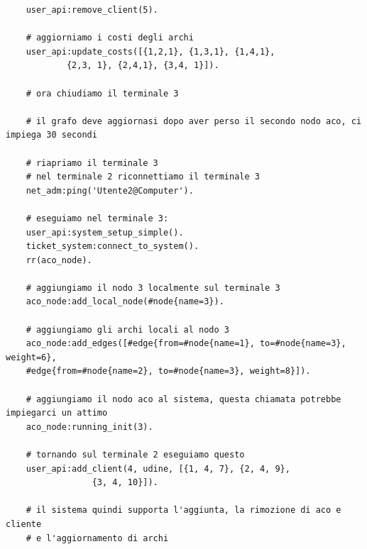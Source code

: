 \begin{verbatim}
    user_api:remove_client(5).

    # aggiorniamo i costi degli archi
    user_api:update_costs([{1,2,1}, {1,3,1}, {1,4,1}, 
            {2,3, 1}, {2,4,1}, {3,4, 1}]).

    # ora chiudiamo il terminale 3
    
    # il grafo deve aggiornasi dopo aver perso il secondo nodo aco, ci impiega 30 secondi

    # riapriamo il terminale 3
    # nel terminale 2 riconnettiamo il terminale 3
    net_adm:ping('Utente2@Computer').

    # eseguiamo nel terminale 3:
    user_api:system_setup_simple().
    ticket_system:connect_to_system().
    rr(aco_node).

    # aggiungiamo il nodo 3 localmente sul terminale 3
    aco_node:add_local_node(#node{name=3}).
     
    # aggiungiamo gli archi locali al nodo 3
    aco_node:add_edges([#edge{from=#node{name=1}, to=#node{name=3}, weight=6}, 
    #edge{from=#node{name=2}, to=#node{name=3}, weight=8}]). 
    
    # aggiungiamo il nodo aco al sistema, questa chiamata potrebbe impiegarci un attimo
    aco_node:running_init(3).

    # tornando sul terminale 2 eseguiamo questo
    user_api:add_client(4, udine, [{1, 4, 7}, {2, 4, 9},
                 {3, 4, 10}]).

    # il sistema quindi supporta l'aggiunta, la rimozione di aco e cliente
    # e l'aggiornamento di archi 
\end{verbatim}
